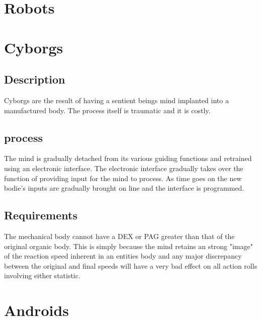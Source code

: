 \chapter{Robots}
\chapter{Cyborgs}
\section{Description}

Cyborgs are the result of having a sentient beings mind implanted 
into a manufactured body. The process itself is traumatic and it is 
costly. 

\section{process}

The mind is gradually detached from its various guiding functions and 
retrained using an electronic interface. The electronic interface 
gradually takes over the function of providing input for the mind to 
process. As time goes on the new bodie's inputs are gradually brought 
on line and the interface is programmed. 

\section{Requirements }

The mechanical body cannot have a DEX or PAG greater than that of the 
original organic body. This is simply because the mind retains an 
strong "image" of the reaction speed inherent in an entities body and 
any major discrepancy between the original and final speeds will have 
a very bad effect on all action rolls involving either statistic. 

\chapter{Androids}


